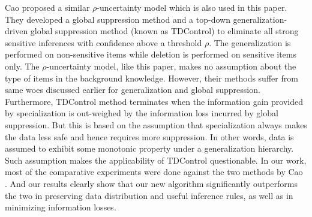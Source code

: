 

Cao \etal \cite{Cao:2010:rho} proposed a similar $\rho$-uncertainty model
which is also used in this paper.
They developed a global suppression method and a top-down
generalization-driven global suppression method (known as TDControl)
to eliminate all strong sensitive inferences with confidence above
a threshold $\rho$.
The generalization is performed on non-sensitive items
while deletion is performed on sensitive items only. The $\rho$-uncertainty
model, like this paper, makes no assumption about the type of items in
the background knowledge. However, their
methods suffer from same woes discussed earlier for generalization and
global suppression.
Furthermore, TDControl method terminates when the information gain provided
by specialization is out-weighed by the information loss incurred by global
suppression. But this is based on the assumption that specialization always
makes the data less safe and hence requires more suppression. In other words,
data is assumed to exhibit some monotonic property under a generalization
hierarchy. Such assumption makes the applicability of TDControl questionable.
In our work, most of the comparative experiments were done against the two
methods by Cao \etal. And our results clearly show that our new algorithm
significantly outperforms the two in preserving data distribution and useful
inference rules, as well as in minimizing information losses.

